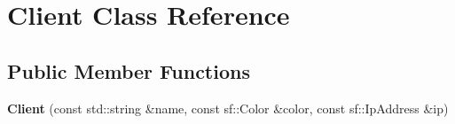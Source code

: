 \hypertarget{class_client}{\section{Client Class Reference}
\label{class_client}
}
\subsection*{Public Member Functions}
\begin{DoxyCompactItemize}
\item 
\hypertarget{class_client_a84ca62805dedd5cfd2a064d981798ca3}{{\bfseries Client} (const std\-::string \&name, const sf\-::\-Color \&color, const sf\-::\-Ip\-Address \&ip)}\label{class_client_a84ca62805dedd5cfd2a064d981798ca3}

\end{DoxyCompactItemize}
